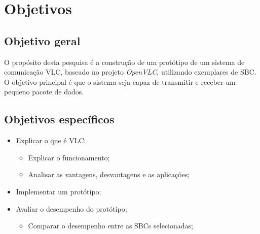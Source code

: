 \section{Objetivos} \label{obj}
\subsection{Objetivo geral}

O propósito desta pesquisa é a construção de um protótipo de um sistema de
comunicação VLC, baseado no projeto \textit{OpenVLC}, utilizando exemplares de SBC. O objetivo principal é que o sistema seja capaz de transmitir e receber um pequeno pacote de dados.

\subsection{Objetivos específicos}

\begin{itemize}

  \item Explicar o que é VLC;
    \begin{itemize}
      \item Explicar o funcionamento;
      \item Analisar as vantagens, desvantagens e as aplicações;
    \end{itemize}

  \item Implementar um protótipo;
  \item Avaliar o desempenho do protótipo;
    \begin{itemize}
      \item Comparar o desempenho entre as SBCs selecionadas;
    \end{itemize}

\end{itemize}

